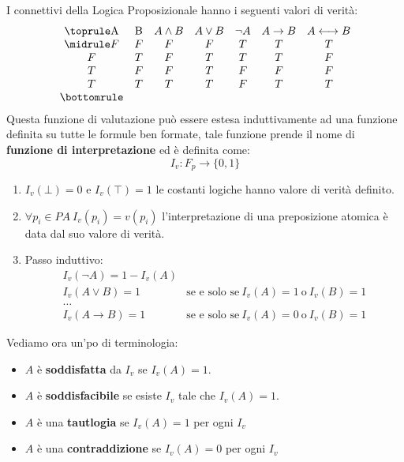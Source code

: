 I connettivi della Logica Proposizionale hanno i seguenti valori di verità:
\begin{equation}
    \begin{array}{ccccccc}
    \toprule
    \text{A} & \text{B} & A \land B & A \lor B & \neg A & A \to B & A \longleftrightarrow B \\
    \midrule
    F & F & F & F & T & T & T \\
    F & T & F & T & T & T & F \\
    T & F & F & T & F & F & F \\
    T & T & T & T & F & T & T \\
    \bottomrule
  \end{array}
\end{equation}
Questa funzione di valutazione può essere estesa induttivamente ad una funzione definita su tutte le formule ben formate, tale funzione prende il nome di \textbf{funzione di interpretazione} ed è definita come:
\begin{equation}
    I_v: F_p \to \{0, 1\}
\end{equation}
\begin{enumerate}
    \item $I_v (\bot) = 0$ e $I_v (\top) = 1$ le costanti logiche hanno valore di verità definito.
    \item $\forall p_i \in PA \ I_v(p_i) = v(p_i)$ l'interpretazione di una preposizione atomica è data dal suo valore di verità.
    \item Passo induttivo:
    \begin{equation}
        \begin{array}{cc}
           I_v(\lnot A) = 1 - I_v(A) & \\ 
           I_v(A \lor B) = 1 & \text{se e solo se} \ I_v(A) = 1 \ \text{o} \ I_v(B) = 1 \\
           \dots & \\
           I_v(A \to B) = 1 & \text{se e solo se} \ I_v(A) = 0 \ \text{o} \ I_v(B) = 1 
        \end{array}
    \end{equation}
\end{enumerate}
Vediamo ora un'po di terminologia:
\begin{itemize}
    \item $A$ è \textbf{soddisfatta} da $I_v$ se $I_v(A) = 1$.
    \item $A$ è \textbf{soddisfacibile} se esiste $I_v$ tale che $I_v(A) = 1$.
    \item $A$ è una \textbf{tautlogia} se $I_v(A) = 1$ per ogni $I_v$
    \item $A$ è una \textbf{contraddizione} se $I_v(A) = 0$ per ogni $I_v$
\end{itemize}
